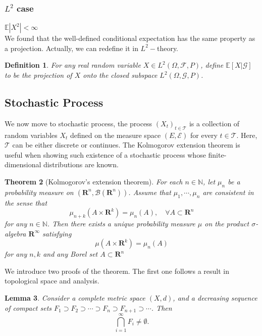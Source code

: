 \documentclass[11pt,english]{smfart}
\newtheorem{theorem}{Theorem}[subsection]
\newtheorem{definition}[theorem]{Definition}
\newtheorem{lemma}[theorem]{Lemma}
\newcommand{\mb}{\mathbb}
\newcommand{\mc}{\mathcal}
\newcommand{\mf}{\mathbf}
\begin{document}
\subsubsection{$L^2$ case}
$\mb{E}|X^2| < \infty$
~\\
We found that the well-defined conditional expectation has the same property as a projection. Actually, we can redefine it in $L^2-$theory. 
~\\
\begin{definition}
    For any real random variable $X\in L^2(\Omega,\mathcal{F},P)$, define $\mb{E}[X|\mathcal{G}]$ to be the projection of $X$ onto the closed subspace $L^2(\Omega,\mathcal{G},P)$.
\end{definition}

\subsection{Stochastic Process}
We now move to stochastic process, the process $\left(X_t\right)_{t\in \mathcal{T}}$ is a collection of random variables $X_t$ defined on the measure space $(E,\mathcal{E})$ for every $t\in \mathcal{T}$. Here, $\mathcal{T}$ can be either discrete or continues. The Kolmogorov extension theorem is useful when showing
such existence of a stochastic process whose finite-dimensional distributions are known.\\

\begin{theorem}[Kolmogorov's extension theorem]\label{Kolmogorov_extension}
    For each $n\in \mb{N}$, let $\mu_n$ be a probability measure on $(\mf{R}^n,\mc{B}(\mf{R}^n))$. Assume that $\mu_1,\cdots,\mu_n$ are consistent in the sense that 
    $$\mu_{n+k}(A \times \mf{R}^k) = \mu_n(A),\quad \forall A \subset \mf{R}^n$$
    for any $n\in\mb{N}$. Then there exists a unique probability measure $\mu$ on the product $\sigma$-algebra $\mf{R}^{\infty}$ satisfying 
    $$\mu(A\times \mf{R}^{k}) = \mu_n(A)$$
    for any $n,k$ and any Borel set $A \subset \mf{R}^{n}$
\end{theorem}

We introduce two proofs of the theorem. The first one follows a result in topological space and analysis. \\

\begin{lemma}
    Consider a complete metric space $(X,d)$, and a decreasing sequence of compact sets $F_1 \supset F_2 \supset \cdots \supset F_n \supset F_{n+1} \supset \cdots$. Then 
    $$\bigcap _{i=1}^\infty F_i \neq \emptyset.$$
\end{lemma}
\end{document}
